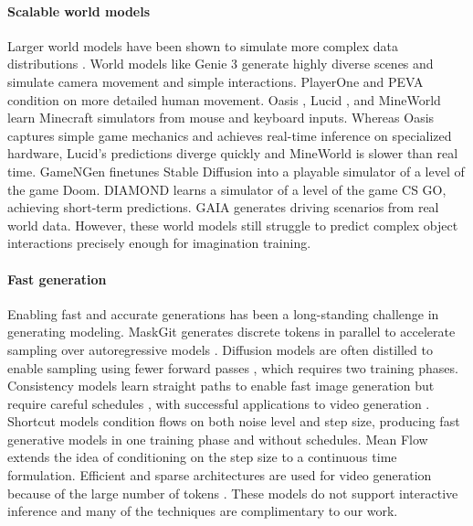 \documentclass[11pt]{article}
\begin{document}
\paragraph{Scalable world models}

Larger world models have been shown to simulate more complex data distributions \citep{yu2025survey}.
World models like Genie 3 generate highly diverse scenes and simulate camera movement and simple interactions\citep{genie3,he2025matrix,sun2025virtual,team2025yan}.
PlayerOne\citep{tu2025playerone} and PEVA\citep{bai2025whole} condition on more detailed human movement.
Oasis \citep{oasis}, Lucid \citep{lucidv1}, and MineWorld \cite{mineworld} learn Minecraft simulators from mouse and keyboard inputs.
Whereas Oasis captures simple game mechanics and achieves real-time inference on specialized hardware, Lucid's predictions diverge quickly and MineWorld is slower than real time.
GameNGen \citep{valevski2024diffusion} finetunes Stable Diffusion into a playable simulator of a level of the game Doom.
DIAMOND \citep{alonso2024diffusion} learns a simulator of a level of the game CS GO, achieving short-term predictions.
GAIA \citep{hu2023gaia,russell2025gaia} generates driving scenarios from real world data.
However, these world models still struggle to predict complex object interactions precisely enough for imagination training.

\paragraph{Fast generation}

Enabling fast and accurate generations has been a long-standing challenge in generating modeling.
MaskGit generates discrete tokens in parallel to accelerate sampling over autoregressive models \citep{chang2022maskgit}.
Diffusion models are often distilled to enable sampling using fewer forward passes \citep{salimans2022progressive,kodaira2025streamdit}, which requires two training phases.
Consistency models learn straight paths to enable fast image generation but require careful schedules \citep{song2023consistency,song2023improved,lu2024simplifying}, with successful applications to video generation \citep{wang2023videolcm}.
Shortcut models \citep{shortcut} condition flows on both noise level and step size, producing fast generative models in one training phase and without schedules.
Mean Flow \citep{geng2025meanflow} extends the idea of conditioning on the step size to a continuous time formulation.
Efficient and sparse architectures are used for video generation because of the large number of tokens \citep{axial,zhao2024real,zhang2025vsa}.
These models do not support interactive inference and many of the techniques are complimentary to our work.
\end{document}
